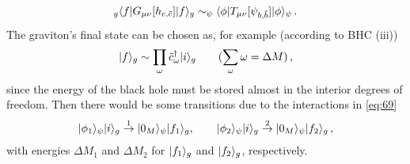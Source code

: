 \documentclass[12pt,a4paper]{article}
\begin{document}
\begin{equation}
\label{eq:73}
\begin{split}
_g\langle f\arrowvert G_{\mu\nu}[h_{c,\tilde{c}}]\arrowvert
f\rangle_g\sim  _{\psi}\langle\phi\arrowvert
T_{\mu\nu}[\psi_{b,\tilde{b}}]\arrowvert\phi\rangle_{\psi} \,.
\end{split}
\end{equation}
The graviton's final state can be chosen as, for example (according to BHC
(iii))
\begin{equation}
\label{eq:74}
\begin{split}
\arrowvert
f\rangle_g\sim\prod_{\omega}\tilde{c}_{\omega}^{\dag}\arrowvert
i\rangle_g\qquad (\sum_{\omega}\omega=\Delta M) \,,
\end{split}
\end{equation}
since the energy of the black hole must be stored almost in the interior degrees of freedom. Then there would be some transitions due to the interactions in
\eqref{eq:69}
\begin{equation}
\label{eq:75}
\begin{split}
\arrowvert\phi_1\rangle_{\psi}\arrowvert
i\rangle_g\stackrel{1}{\rightarrow}
\arrowvert0_M\rangle_{\psi}\arrowvert f_1\rangle_g,\qquad
\arrowvert\phi_2\rangle_{\psi}\arrowvert
i\rangle_g\stackrel{2}{\rightarrow}
\arrowvert0_M\rangle_{\psi}\arrowvert f_2\rangle_g \,,
\end{split}
\end{equation}
with energies $\Delta M_1$ and $\Delta M_2$ for $\arrowvert
f_1\rangle_g$ and $\arrowvert f_2\rangle_g$, respectively.
\end{document}
